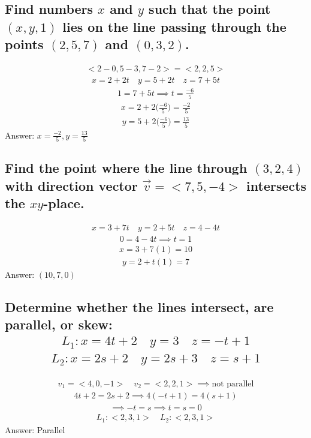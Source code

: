 \documentclass{article}
\begin{document}
\subsection{Find numbers $x$ and $y$ such that the point $(x, y, 1)$ lies on the line passing through the points $(2, 5, 7)$ and $(0, 3, 2)$.}
\begin{align*}
	<2 - 0, 5 - 3, 7 - 2> = <2, 2, 5>
\end{align*}
\begin{align*}
	x = 2 + 2t \quad y = 5 + 2t \quad z = 7 + 5t
\end{align*}
\begin{align*}
	1 = 7 + 5t \implies t = \frac{-6}{5}
\end{align*}
\begin{align*}
	x = 2 + 2 \bigg( \frac{-6}{5} \bigg) = \frac{-2}{5}
\end{align*}
\begin{align*}
	y = 5 + 2 \bigg( \frac{-6}{5} \bigg) = \frac{13}{5}
\end{align*}
Answer: $x = \frac{-2}{5}, y = \frac{13}{5}$

\subsection{Find the point where the line through $(3, 2, 4)$ with direction vector $\vec{v} = <7, 5, -4>$ intersects the $xy$-place.}
\begin{align*}
	x = 3 + 7t \quad y = 2 + 5t \quad z = 4 - 4t
\end{align*}
\begin{align*}
	0 = 4 - 4t \implies t = 1
\end{align*}
\begin{align*}
	x = 3 + 7(1) = 10
\end{align*}
\begin{align*}
	y = 2 +t(1) = 7
\end{align*}
Answer: $(10, 7, 0)$

\subsection{Determine whether the lines intersect, are parallel, or skew:
	\begin{align*}
		L_1: x = 4t + 2 \quad y = 3 \quad z = -t + 1
	\end{align*}
	\begin{align*}
		L_2: x = 2s + 2 \quad y = 2s + 3 \quad z = s + 1
	\end{align*}
}
\begin{align*}
	v_1 = <4, 0, -1> \quad v_2 = <2, 2, 1> \implies \text{not parallel}
\end{align*}
\begin{align*}
	4t + 2 = 2s + 2 \implies 4(-t + 1) = 4(s + 1)
\end{align*}
\begin{align*}
	\implies -t = s \implies t = s = 0
\end{align*}
\begin{align*}
	L_1: <2, 3, 1> \quad L_2: <2, 3, 1>
\end{align*}
Answer: Parallel
\end{document}
